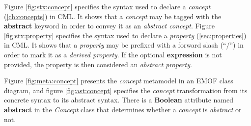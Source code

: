 Figure \ref{fig:stx:concept} specifies the syntax used
to declare a \emph{concept} (\ref{ch:concepts}) in CML.
It shows that a \emph{concept} may be tagged with the \textbf{abstract} keyword
in order to convey it as an \emph{abstract concept}.
Figure \ref{fig:stx:property} specifies the syntax used 
to declare a \emph{property} (\ref{sec:properties}) in CML.
It shows that a \emph{property} may be prefixed with a forward slash (``/'')
in order to mark it as a \emph{derived property}.
If the optional \textbf{expression} is not provided,
the property is then considered an \emph{abstract property}.

Figure \ref{fig:meta:concept} presents the \emph{concept} metamodel
in an EMOF \cite{mof} class diagram,
and figure \ref{fig:ast:concept} specifies
the \emph{concept} transformation
from its concrete syntax to its abstract syntax.
There is a \textbf{Boolean} attribute named \textbf{abstract} in the \emph{Concept} class
that determines whether a \emph{concept} is \emph{abstract} or not.
